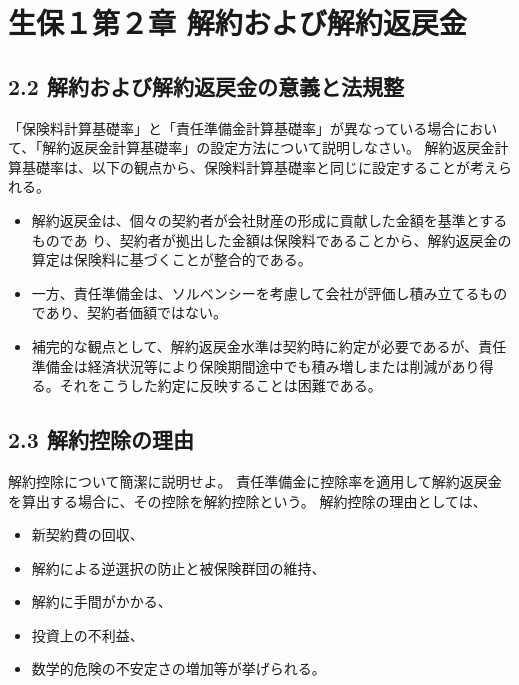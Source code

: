 \documentclass[report,gutter=10mm,fore-edge=10mm,uplatex,dvipdfmx]{jlreq}
\begin{document}
\chapter{生保１第２章 解約および解約返戻金}
\section{2.2 解約および解約返戻金の意義と法規整}
「保険料計算基礎率」と「責任準備金計算基礎率」が異なっている場合において、「解約返戻金計算基礎率」の設定方法について説明しなさい。
解約返戻金計算基礎率は、以下の観点から、保険料計算基礎率と同じに設定することが考えられる。  
\begin{itemize}
\item 解約返戻金は、個々の契約者が会社財産の形成に貢献した金額を基準とするものであ  り、契約者が拠出した金額は保険料であることから、解約返戻金の算定は保険料に基づくことが整合的である。
\item 一方、責任準備金は、ソルベンシーを考慮して会社が評価し積み立てるものであり、契約者価額ではない。
\item 補完的な観点として、解約返戻金水準は契約時に約定が必要であるが、責任準備金は経済状況等により保険期間途中でも積み増しまたは削減があり得る。それをこうした約定に反映することは困難である。
\end{itemize}

\section{2.3 解約控除の理由}

解約控除について簡潔に説明せよ。
責任準備金に控除率を適用して解約返戻金を算出する場合に、その控除を解約控除という。
解約控除の理由としては、
\begin{itemize}
\item 新契約費の回収、
\item 解約による逆選択の防止と被保険群団の維持、
\item 解約に手間がかかる、
\item 投資上の不利益、
\item 数学的危険の不安定さの増加等が挙げられる。
\end{itemize}
\end{document}
